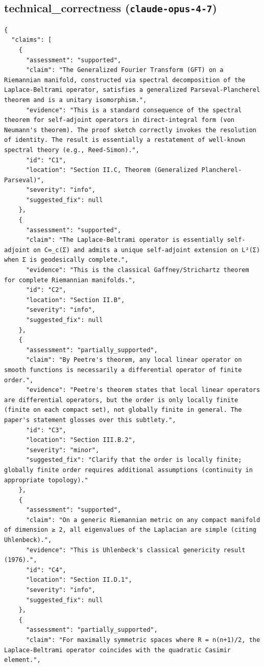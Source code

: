 \documentclass[11pt]{article}
\begin{document}
\subsection*{technical_correctness (\texttt{claude-opus-4-7})}
\begin{verbatim}
{
  "claims": [
    {
      "assessment": "supported",
      "claim": "The Generalized Fourier Transform (GFT) on a Riemannian manifold, constructed via spectral decomposition of the Laplace-Beltrami operator, satisfies a generalized Parseval-Plancherel theorem and is a unitary isomorphism.",
      "evidence": "This is a standard consequence of the spectral theorem for self-adjoint operators in direct-integral form (von Neumann's theorem). The proof sketch correctly invokes the resolution of identity. The result is essentially a restatement of well-known spectral theory (e.g., Reed-Simon).",
      "id": "C1",
      "location": "Section II.C, Theorem (Generalized Plancherel-Parseval)",
      "severity": "info",
      "suggested_fix": null
    },
    {
      "assessment": "supported",
      "claim": "The Laplace-Beltrami operator is essentially self-adjoint on C∞_c(Σ) and admits a unique self-adjoint extension on L²(Σ) when Σ is geodesically complete.",
      "evidence": "This is the classical Gaffney/Strichartz theorem for complete Riemannian manifolds.",
      "id": "C2",
      "location": "Section II.B",
      "severity": "info",
      "suggested_fix": null
    },
    {
      "assessment": "partially_supported",
      "claim": "By Peetre's theorem, any local linear operator on smooth functions is necessarily a differential operator of finite order.",
      "evidence": "Peetre's theorem states that local linear operators are differential operators, but the order is only locally finite (finite on each compact set), not globally finite in general. The paper's statement glosses over this subtlety.",
      "id": "C3",
      "location": "Section III.B.2",
      "severity": "minor",
      "suggested_fix": "Clarify that the order is locally finite; globally finite order requires additional assumptions (continuity in appropriate topology)."
    },
    {
      "assessment": "supported",
      "claim": "On a generic Riemannian metric on any compact manifold of dimension ≥ 2, all eigenvalues of the Laplacian are simple (citing Uhlenbeck).",
      "evidence": "This is Uhlenbeck's classical genericity result (1976).",
      "id": "C4",
      "location": "Section II.D.1",
      "severity": "info",
      "suggested_fix": null
    },
    {
      "assessment": "partially_supported",
      "claim": "For maximally symmetric spaces where R = n(n+1)/2, the Laplace-Beltrami operator coincides with the quadratic Casimir element.",

\end{verbatim}
\end{document}
